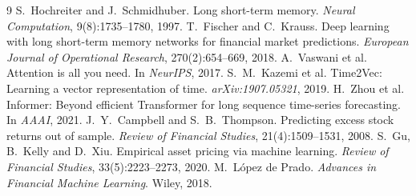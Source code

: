 \documentclass[11pt,a4paper]{article}
\begin{document}
\begin{thebibliography}{9}\small
{} S.~Hochreiter and J.~Schmidhuber. Long short-term memory. \emph{Neural Computation}, 9(8):1735--1780, 1997.
 T.~Fischer and C.~Krauss. Deep learning with long short-term memory networks for financial market predictions. \emph{European Journal of Operational Research}, 270(2):654--669, 2018.
 A.~Vaswani et al. Attention is all you need. In \emph{NeurIPS}, 2017.
 S.~M.~Kazemi et al. Time2Vec: Learning a vector representation of time. \emph{arXiv:1907.05321}, 2019.
 H.~Zhou et al. Informer: Beyond efficient Transformer for long sequence time-series forecasting. In \emph{AAAI}, 2021.
 J.~Y.~Campbell and S.~B.~Thompson. Predicting excess stock returns out of sample. \emph{Review of Financial Studies}, 21(4):1509--1531, 2008.
 S.~Gu, B.~Kelly and D.~Xiu. Empirical asset pricing via machine learning. \emph{Review of Financial Studies}, 33(5):2223--2273, 2020.
 M.~L\'opez de Prado. \emph{Advances in Financial Machine Learning}. Wiley, 2018.
\end{thebibliography}
\end{document}
